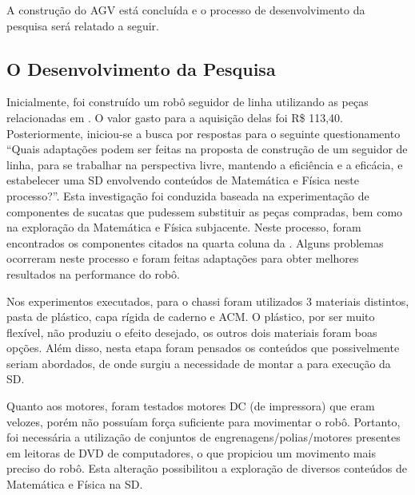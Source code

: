 \documentclass{textolivre}
\begin{document}
A construção do AGV está concluída e o processo de desenvolvimento da pesquisa
será relatado a seguir.


\subsection{O Desenvolvimento da Pesquisa}\label{sec-desenvolvimento}
Inicialmente, foi construído um robô seguidor de linha utilizando as peças
relacionadas em \textcite{thenorio}. O valor gasto para a aquisição delas foi R\$
113,40. Posteriormente, iniciou-se a busca por respostas para o seguinte
questionamento “Quais adaptações podem ser feitas na proposta de construção de
um seguidor de linha, para se trabalhar na perspectiva livre, mantendo a
eficiência e a eficácia, e estabelecer uma SD envolvendo conteúdos de
Matemática e Física neste processo?”. Esta investigação foi conduzida baseada
na experimentação de componentes de sucatas que pudessem substituir as peças
compradas, bem como na exploração da Matemática e Física subjacente. Neste
processo, foram encontrados os componentes citados na quarta coluna da .
Alguns problemas ocorreram neste processo e foram feitas adaptações para
obter melhores resultados na performance do robô.

Nos experimentos executados, para o chassi foram utilizados 3 materiais
distintos, pasta de plástico, capa rígida de caderno e ACM. O plástico, por ser
muito flexível, não produziu o efeito desejado, os outros dois materiais foram
boas opções. Além disso, nesta etapa foram pensados os conteúdos que
possivelmente seriam abordados, de onde surgiu a necessidade de montar a 
para execução da SD.

Quanto aos motores, foram testados motores DC (de impressora) que eram velozes,
porém não possuíam força suficiente para movimentar o robô. Portanto, foi
necessária a utilização de conjuntos de engrenagens/polias/motores presentes em
leitoras de DVD de computadores, o que propiciou um movimento mais preciso do
robô. Esta alteração possibilitou a exploração de diversos conteúdos de
Matemática e Física na SD.
\end{document}

